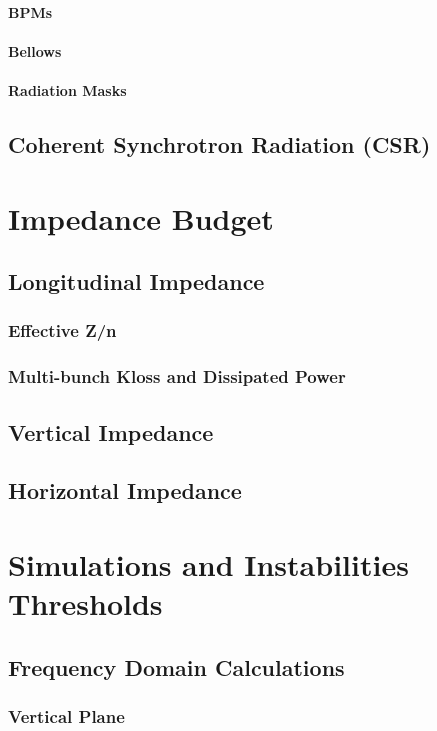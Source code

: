 \documentclass[
	12pt,				%
	openright,			%
	oneside,			%
	a4paper,		%
	chapter=TITLE,		%
	section=TITLE,		%
    brazil,				%
	english,			%
	sumario=tradicional,
	]{abntex2}
\begin{document}
        \paragraph{BPMs}
        \paragraph{Bellows}
        \paragraph{Radiation Masks}
    \subsection{Coherent Synchrotron Radiation (CSR)}
  \section{Impedance Budget}
    \subsection{Longitudinal Impedance}
      \subsubsection{Effective Z/n}
      \subsubsection{Multi-bunch Kloss and Dissipated Power}
    \subsection{Vertical Impedance}
    \subsection{Horizontal Impedance}
  \section{Simulations and Instabilities Thresholds}
    \subsection{Frequency Domain Calculations}
      \subsubsection{Vertical Plane}
\end{document}
